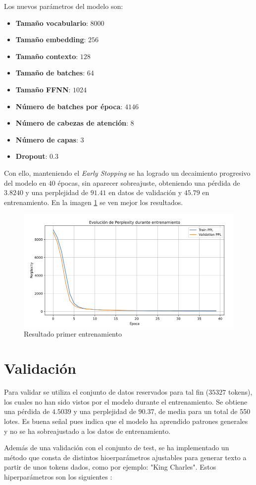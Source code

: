 \documentclass[11pt]{book}
\theoremstyle{plain}
\theoremstyle{definition}
\begin{document}
Los nuevos parámetros del modelo son:
\begin{itemize}
    \item \textbf{Tamaño vocabulario}: $8000$
    \item \textbf{Tamaño embedding}: $256$
    \item \textbf{Tamaño contexto}: $128$
    \item \textbf{Tamaño de batches}: $64$
    \item \textbf{Tamaño FFNN}: $1024$
    \item \textbf{Número de batches por época}: $4146$
    \item \textbf{Número de cabezas de atención}: $8$
    \item \textbf{Número de capas}: $3$
    \item \textbf{Dropout}: $0.3$
\end{itemize}
Con ello, manteniendo el \textit{Early Stopping} se ha logrado un decaimiento progresivo del modelo en $40$ épocas, sin aparecer sobreajuste, obteniendo una pérdida de $3.8240$ y una perplejidad de $91.41$ en datos de validación y $45.79$ en entrenamiento. En la imagen \ref{fig:placeholder25} se ven mejor los resultados.


\begin{figure}[h]
    \centering
    \includegraphics[width=0.5\linewidth]{img/resultado_entrenamiento_v2.png}
    \caption{Resultado primer entrenamiento}
    \label{fig:placeholder25}
\end{figure}

\section{Validación}
Para validar se utiliza el conjunto de datos reservados para tal fin ($35327$ tokens), los cuales no han sido vistos por el modelo durante el entrenamiento. Se obtiene una pérdida de $4.5039$ y una perplejidad de $90.37$, de media para un total de 550 lotes. Es buena señal pues indica que el modelo ha aprendido patrones generales y no se ha sobreajustado a los datos de entrenamiento.

Además de una validación con el conjunto de test, se ha implementado un método que consta de distintos hioerparámetros ajustables para generar texto a partir de unos tokens dados, como por ejemplo: "King Charles". Estos hiperparámetros son los siguientes \parencite{vyas2025transformer_decoder_part3}: 
\end{document}
